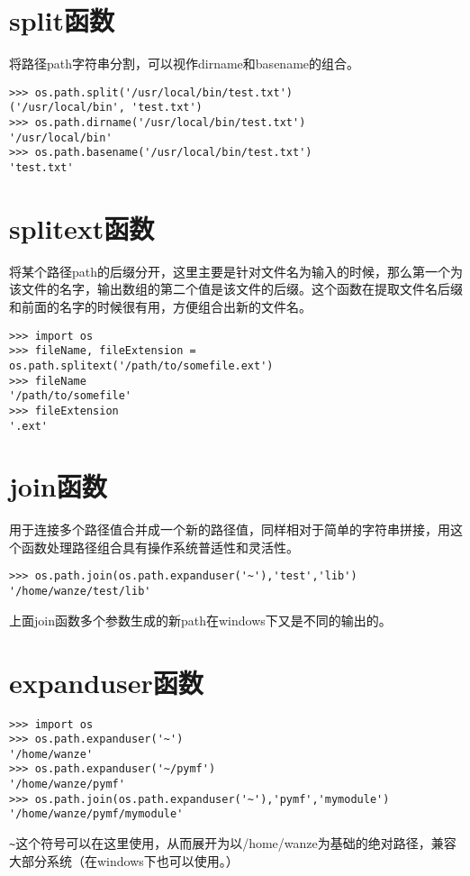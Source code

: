 \documentclass[12pt,oneside]{book}
\begin{document}
\begin{common-format}
\section{split函数}
将路径path字符串分割，可以视作dirname和basename的组合。
\begin{Verbatim}
>>> os.path.split('/usr/local/bin/test.txt')
('/usr/local/bin', 'test.txt')
>>> os.path.dirname('/usr/local/bin/test.txt')
'/usr/local/bin'
>>> os.path.basename('/usr/local/bin/test.txt')
'test.txt'
\end{Verbatim}



\section{splitext函数}
将某个路径path的后缀分开，这里主要是针对文件名为输入的时候，那么第一个为该文件的名字，输出数组的第二个值是该文件的后缀。这个函数在提取文件名后缀和前面的名字的时候很有用，方便组合出新的文件名。
\begin{Verbatim}
>>> import os
>>> fileName, fileExtension = os.path.splitext('/path/to/somefile.ext')
>>> fileName
'/path/to/somefile'
>>> fileExtension
'.ext'
\end{Verbatim}


\section{join函数}
用于连接多个路径值合并成一个新的路径值，同样相对于简单的字符串拼接，用这个函数处理路径组合具有操作系统普适性和灵活性。
\begin{Verbatim}
>>> os.path.join(os.path.expanduser('~'),'test','lib')
'/home/wanze/test/lib'
\end{Verbatim}

上面join函数多个参数生成的新path在windows下又是不同的输出的。



\section{expanduser函数}
\begin{Verbatim}
>>> import os
>>> os.path.expanduser('~')
'/home/wanze'
>>> os.path.expanduser('~/pymf')
'/home/wanze/pymf'
>>> os.path.join(os.path.expanduser('~'),'pymf','mymodule')
'/home/wanze/pymf/mymodule'
\end{Verbatim}

\verb+~+这个符号可以在这里使用，从而展开为以/home/wanze为基础的绝对路径，兼容大部分系统（在windows下也可以使用。）


\end{common-format}
\end{document}
